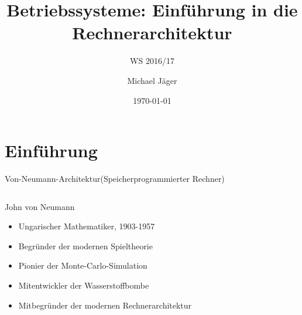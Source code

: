 \documentclass[utf8,9pt]{beamer}
\title{Betriebssysteme: Einführung in die Rechnerarchitektur}
\subtitle{WS 2016/17}
\author{Michael Jäger}
\date{\today}
\begin{document}
\frame{\titlepage}


\part{Einführung}






\begin{frame}{Von-Neumann-Architektur}{(Speicherprogrammierter Rechner)}
\begin{columns}
\begin{block}{John von Neumann}
\tiny\fontsize{8pt}{8pt}\selectfont

\begin{itemize}
\item Ungarischer Mathematiker, 1903-1957
\item Begründer der modernen Spieltheorie
\item Pionier der Monte-Carlo-Simulation
\item Mitentwickler der Wasserstoffbombe
\item Mitbegründer der modernen Rechnerarchitektur
\end{itemize}
 \vspace*{-5mm} 
\end{block}

\vspace*{3mm} 

\vspace*{3mm}
\hspace*{-4mm}
 \end{columns}
\end{frame}
\end{document}
